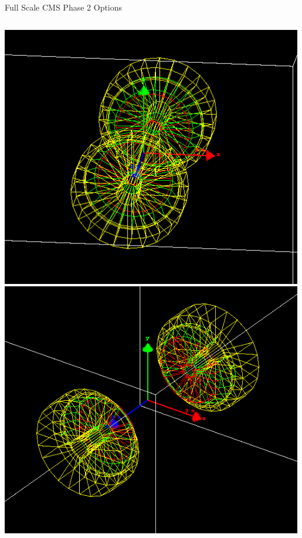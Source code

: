 \documentclass[pdf, 9pt]{beamer}
\begin{document}
\begin{frame}{Full Scale CMS Phase 2 Options}
\begin{columns}[T]
\begin{column}{0.5\textwidth}
        \includegraphics[width=0.99\textwidth, height=0.45\textheight]{figs/hgcal_fullscale/HGC_20_70.png}\\
        \includegraphics[width=0.99\textwidth, height=0.45\textheight]{figs/hgcal_fullscale/HGC_45_45.png}
      \end{column}
    \end{columns}
  \end{frame}
\end{document}
